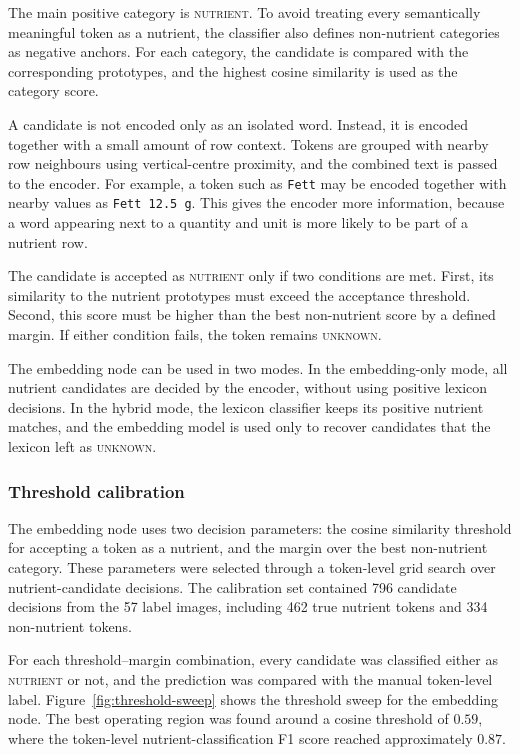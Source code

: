 The main positive category is \textsc{nutrient}. To avoid treating every semantically meaningful token as a nutrient, the classifier also defines non-nutrient categories as negative anchors. For each category, the candidate is compared with the corresponding prototypes, and the highest cosine similarity is used as the category score.

A candidate is not encoded only as an isolated word. Instead, it is encoded together with a small amount of row context. Tokens are grouped with nearby row neighbours using vertical-centre proximity, and the combined text is passed to the encoder. For example, a token such as \texttt{Fett} may be encoded together with nearby values as \texttt{Fett 12.5 g}. This gives the encoder more information, because a word appearing next to a quantity and unit is more likely to be part of a nutrient row.

The candidate is accepted as \textsc{nutrient} only if two conditions are met. First, its similarity to the nutrient prototypes must exceed the acceptance threshold. Second, this score must be higher than the best non-nutrient score by a defined margin. If either condition fails, the token remains \textsc{unknown}.

The embedding node can be used in two modes. In the embedding-only mode, all nutrient candidates are decided by the encoder, without using positive lexicon decisions. In the hybrid mode, the lexicon classifier keeps its positive nutrient matches, and the embedding model is used only to recover candidates that the lexicon left as \textsc{unknown}.

\subsubsection{Threshold calibration}

The embedding node uses two decision parameters: the cosine similarity threshold for accepting a token as a nutrient, and the margin over the best non-nutrient category. These parameters were selected through a token-level grid search over nutrient-candidate decisions. The calibration set contained 796 candidate decisions from the 57 label images, including 462 true nutrient tokens and 334 non-nutrient tokens.

For each threshold--margin combination, every candidate was classified either as \textsc{nutrient} or not, and the prediction was compared with the manual token-level label. Figure~\ref{fig:threshold-sweep} shows the threshold sweep for the embedding node. The best operating region was found around a cosine threshold of \(0.59\), where the token-level nutrient-classification F1 score reached approximately \(0.87\).

